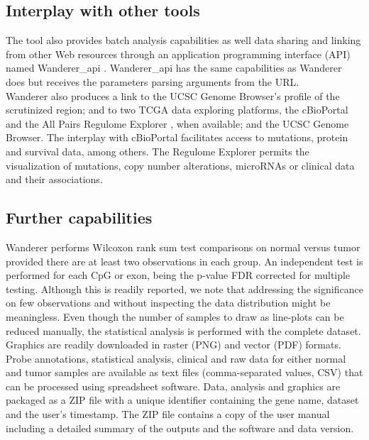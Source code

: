 \documentclass{bmcart}
\begin{document}
{\color{red}
\subsection*{Interplay with other tools}

The tool also provides batch analysis capabilities as well data sharing and linking from other Web resources through an application programming interface (API) named Wanderer\_api \cite{wandererapi}. Wanderer\_api has the same capabilities as Wanderer does but receives the parameters parsing arguments from the URL.\\ 

Wanderer also produces a link to the UCSC Genome Browser's profile of the scrutinized region; and to two TCGA data exploring platforms, the cBioPortal \cite{gao2013integrative} and the All Pairs Regulome Explorer \cite{cancer2012comprehensive}, when available; {\color{red} and the UCSC Genome Browser}. The interplay with cBioPortal facilitates access to mutations, protein and survival data, among others. The Regulome Explorer permits the visualization of mutations, copy number alterations, microRNAs or clinical data and their associations.}


\subsection*{Further capabilities}
Wanderer performs Wilcoxon rank sum test comparisons on normal versus tumor provided there are at least two observations in each group. An independent test is performed for each CpG or exon, being the p-value FDR corrected for multiple testing. Although this is readily reported, we note that addressing the significance on few observations and without inspecting the data distribution might be meaningless. Even though the number of samples to draw as line-plots can be reduced manually, the statistical analysis is performed with the complete dataset.\\





Graphics are readily downloaded {\color{red} in raster (PNG) and vector (PDF) formats}. Probe annotations, statistical analysis, {\color{red} clinical} and raw data for either normal and tumor samples {\color{red} are available} as text files (comma-separated values, CSV) that can be processed using spreadsheet software. {\color{red} Data, analysis and graphics are packaged as a ZIP file with a unique identifier containing the gene name, dataset and the user's timestamp. The ZIP file contains a copy of the user manual including a detailed summary of the outputs and the software and data version.} \\
\end{document}
